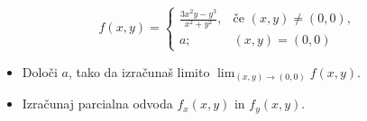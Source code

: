 \documentclass[a4paper,12pt]{article}
\begin{document}
\begin{equation*}
f(x,y) = 
\begin{cases}
\frac{3x^2y-y^3}{x^2+y^2}, & \text{če } (x,y) \neq (0,0),\\
a; &(x,y) =(0,0)
\end{cases}
\end{equation*}
   
\begin{itemize}
\item Določi \(a\), tako da izračunaš limito \( \lim_{(x,y)\to(0,0)} f(x,y) \).
\item Izračunaj parcialna odvoda \(f_x(x,y)\) in \(f_y(x,y)\).
\end{itemize}
\end{document}
